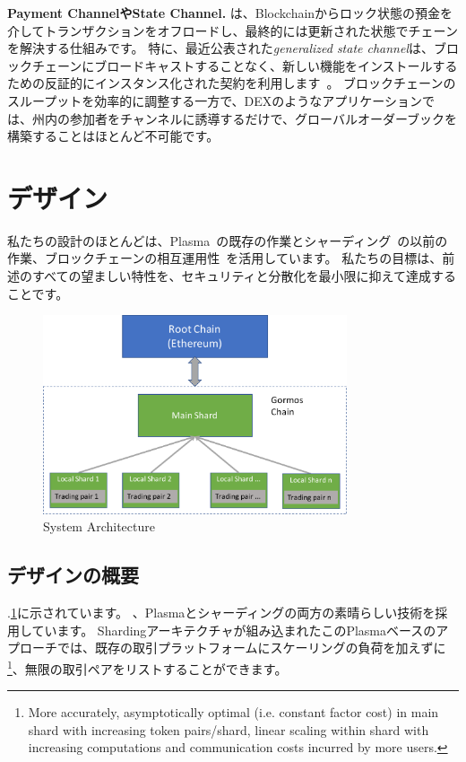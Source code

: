 \textbf{Payment ChannelやState Channel.}\cite{lightning, miller2017sprites} は、Blockchainからロック状態の預金を介してトランザクションをオフロードし、最終的には更新された状態でチェーンを解決する仕組みです。 特に、最近公表された\textit{generalized state channel}は、ブロックチェーンにブロードキャストすることなく、新しい機能をインストールするための反証的にインスタンス化された契約を利用します~\cite{Coleman2018, Dziembowski2018}。 ブロックチェーンのスループットを効率的に調整する一方で、DEXのようなアプリケーションでは、州内の参加者をチャンネルに誘導するだけで、グローバルオーダーブックを構築することはほとんど不可能です。


\section{デザイン}

私たちの設計のほとんどは、Plasma~\cite{plasma}の既存の作業とシャーディング~\cite{elastico}の以前の作業、ブロックチェーンの相互運用性~\cite{peacerelay}を活用しています。 私たちの目標は、前述のすべての望ましい特性を、セキュリティと分散化を最小限に抑えて達成することです。


\begin{figure}[t]
  \centering
  \includegraphics[width=0.8\textwidth]{images//architecture}
  \caption{\codename System Architecture}
  \label{architecture}
\end{figure}


\subsection{デザインの概要}

.\ref{architecture}に示されています。 、Plasmaとシャーディングの両方の素晴らしい技術を採用しています。 Shardingアーキテクチャが組み込まれたこのPlasmaベースのアプローチでは、既存の取引プラットフォームにスケーリングの負荷を加えずに\footnote{More accurately, asymptotically optimal (i.e. constant factor cost) in main shard with increasing token pairs/shard, linear scaling within shard with increasing computations and communication costs incurred by more users.}、無限の取引ペアをリストすることができます。

